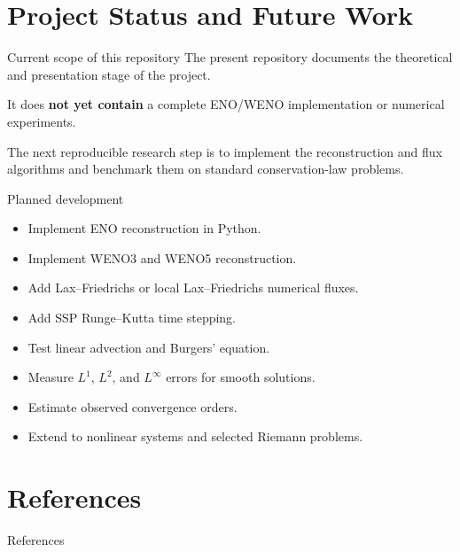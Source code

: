 \documentclass[aspectratio=169]{beamer}
\begin{document}
\section{Project Status and Future Work}

\begin{frame}{Current scope of this repository}
The present repository documents the theoretical and presentation stage of the project.

\medskip
It does \textbf{not yet contain} a complete ENO/WENO implementation or numerical experiments.

\medskip
The next reproducible research step is to implement the reconstruction and flux algorithms and benchmark them on standard conservation-law problems.
\end{frame}

\begin{frame}{Planned development}
\begin{itemize}
    \item Implement ENO reconstruction in Python.
    \item Implement WENO3 and WENO5 reconstruction.
    \item Add Lax--Friedrichs or local Lax--Friedrichs numerical fluxes.
    \item Add SSP Runge--Kutta time stepping.
    \item Test linear advection and Burgers' equation.
    \item Measure $L^1$, $L^2$, and $L^\infty$ errors for smooth solutions.
    \item Estimate observed convergence orders.
    \item Extend to nonlinear systems and selected Riemann problems.
\end{itemize}
\end{frame}

\section{References}

\begin{frame}[allowframebreaks]{References}
    
    
\end{frame}
\end{document}
